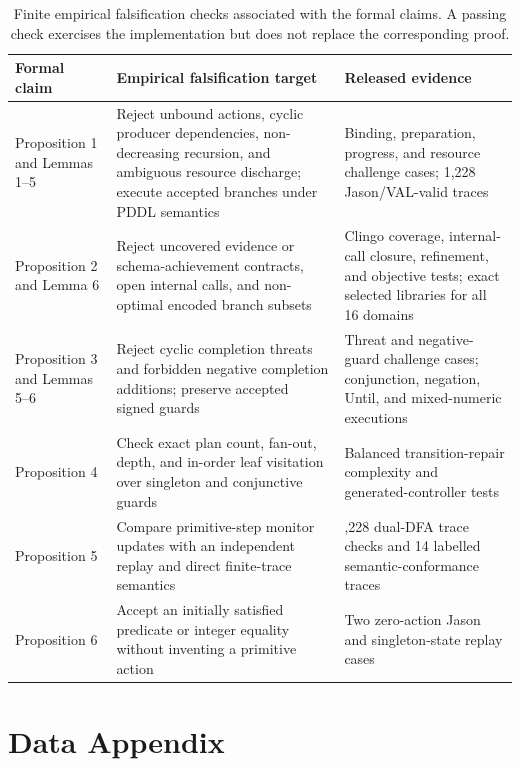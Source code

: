 \begin{table}[htbp]
\centering
\small
\setlength{\tabcolsep}{4pt}
\begin{tabular}{>{\raggedright\arraybackslash}p{}
	>{\raggedright\arraybackslash}p{}
	>{\raggedright\arraybackslash}p{}}
\toprule
Formal claim & Empirical falsification target & Released evidence \\
\midrule
Proposition 1 and Lemmas 1--5 &
Reject unbound actions, cyclic producer dependencies, non-decreasing
recursion, and ambiguous resource discharge; execute accepted branches under
PDDL semantics &
Binding, preparation, progress, and resource challenge cases; 1,228
Jason/VAL-valid traces \\
Proposition 2 and Lemma 6 &
Reject uncovered evidence or schema-achievement contracts, open internal calls,
and non-optimal encoded branch subsets &
Clingo coverage, internal-call closure, refinement, and objective tests; exact selected
libraries for all 16 domains \\
Proposition 3 and Lemmas 5--6 &
Reject cyclic completion threats and forbidden negative completion additions;
preserve accepted signed guards &
Threat and negative-guard challenge cases; conjunction, negation, Until, and
mixed-numeric executions \\
Proposition 4 &
Check exact plan count, fan-out, depth, and in-order leaf visitation over
singleton and conjunctive guards &
Balanced transition-repair complexity and generated-controller tests \\
Proposition 5 &
Compare primitive-step monitor updates with an independent replay and direct
finite-trace semantics &
1,228 dual-DFA trace checks and 14 labelled semantic-conformance traces \\
Proposition 6 &
Accept an initially satisfied predicate or integer equality without inventing
a primitive action &
Two zero-action Jason and singleton-state replay cases \\
\bottomrule
\end{tabular}
\caption{Finite empirical falsification checks associated with the formal
claims. A passing check exercises the implementation but does not replace the
corresponding proof.}
\label{tab:claim-checks}
\end{table}

\section{Data Appendix}
\label{app:data}

